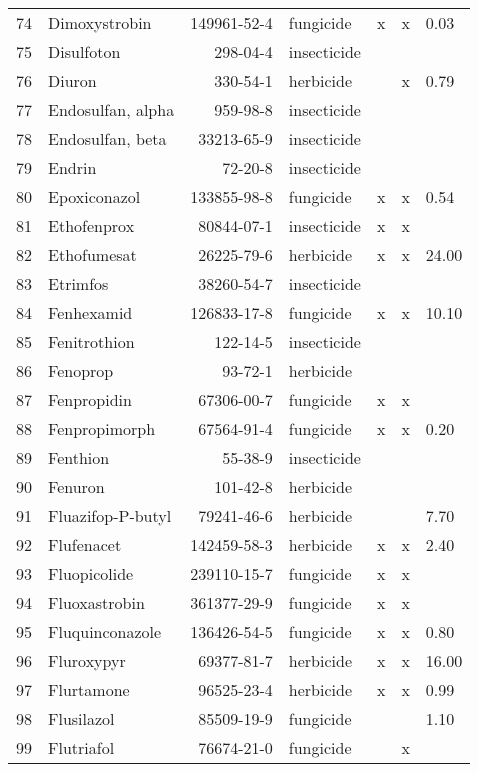 \begin{longtable}{lp{3cm}rlp{0.5cm}p{0.5cm}p{1cm}}
  74 & Dimoxystrobin & 149961-52-4 & fungicide & x & x & 0.03 \\ 
  75 & Disulfoton & 298-04-4 & insecticide &  &  &  \\ 
  76 & Diuron & 330-54-1 & herbicide &  & x & 0.79 \\ 
  77 & Endosulfan, alpha & 959-98-8 & insecticide &  &  &  \\ 
  78 & Endosulfan, beta & 33213-65-9 & insecticide &  &  &  \\ 
  79 & Endrin & 72-20-8 & insecticide &  &  &  \\ 
  80 & Epoxiconazol & 133855-98-8 & fungicide & x & x & 0.54 \\ 
  81 & Ethofenprox & 80844-07-1 & insecticide & x & x &  \\ 
  82 & Ethofumesat & 26225-79-6 & herbicide & x & x & 24.00 \\ 
  83 & Etrimfos & 38260-54-7 & insecticide &  &  &  \\ 
  84 & Fenhexamid & 126833-17-8 & fungicide & x & x & 10.10 \\ 
  85 & Fenitrothion & 122-14-5 & insecticide &  &  &  \\ 
  86 & Fenoprop & 93-72-1 & herbicide &  &  &  \\ 
  87 & Fenpropidin & 67306-00-7 & fungicide & x & x &  \\ 
  88 & Fenpropimorph & 67564-91-4 & fungicide & x & x & 0.20 \\ 
  89 & Fenthion & 55-38-9 & insecticide &  &  &  \\ 
  90 & Fenuron & 101-42-8 & herbicide &  &  &  \\ 
  91 & Fluazifop-P-butyl & 79241-46-6 & herbicide &  &  & 7.70 \\ 
  92 & Flufenacet & 142459-58-3 & herbicide & x & x & 2.40 \\ 
  93 & Fluopicolide & 239110-15-7 & fungicide & x & x &  \\ 
  94 & Fluoxastrobin & 361377-29-9 & fungicide & x & x &  \\ 
  95 & Fluquinconazole & 136426-54-5 & fungicide & x & x & 0.80 \\ 
  96 & Fluroxypyr & 69377-81-7 & herbicide & x & x & 16.00 \\ 
  97 & Flurtamone & 96525-23-4 & herbicide & x & x & 0.99 \\ 
  98 & Flusilazol & 85509-19-9 & fungicide &  &  & 1.10 \\ 
  99 & Flutriafol & 76674-21-0 & fungicide &  & x &  \\ 

\end{longtable}
